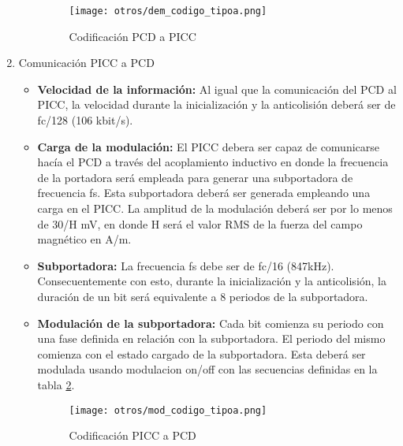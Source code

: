 \begin{enumerate}
\begin{itemize}
\begin{figure}[H]
\centering
\texttt{[image: otros/dem\_codigo\_tipoa.png]}
\caption{Codificación PCD a PICC}
\label{fig:dem_cod_tipoa}
\end{figure}


\end{itemize}

\item Comunicación PICC a PCD

\begin{itemize}
\item \textbf{Velocidad de la información:} Al igual que la comunicación del PCD al PICC, la velocidad durante la inicialización y la anticolisión deberá ser de fc/128 (106 kbit/s).
\item \textbf{Carga de la modulación:} El PICC debera ser capaz de comunicarse hacía el PCD a través del acoplamiento inductivo en donde la frecuencia de la portadora será empleada para generar una subportadora de frecuencia fs. Esta subportadora deberá ser generada empleando una carga en el PICC. La amplitud de la modulación deberá ser por lo menos de 30/H mV, en donde H será el valor RMS de la fuerza del campo magnético en A/m.
\item \textbf{Subportadora:} La frecuencia fs debe ser de fc/16 (847kHz). Consecuentemente con esto, durante la inicialización y la anticolisión, la duración de un bit será equivalente a 8 periodos de la subportadora.
\item \textbf{Modulación de la subportadora:} Cada bit comienza su periodo con una fase definida en relación con la subportadora. El periodo del mismo comienza con el estado cargado de la subportadora. Esta deberá ser modulada usando modulacion on/off con las secuencias definidas en la tabla \ref{fig:mod_cod_tipoa}.

\begin{figure}[H]
\centering
\texttt{[image: otros/mod\_codigo\_tipoa.png]}
\caption{Codificación PICC a PCD}
\label{fig:mod_cod_tipoa}
\end{figure}

\end{itemize}


\end{enumerate}